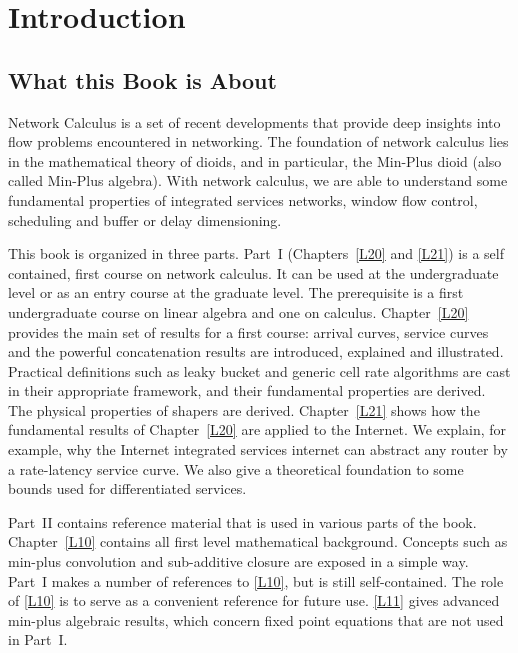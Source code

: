 \chapter{Introduction}

\section*{What this Book is About}
Network Calculus is a set of recent developments that provide deep
insights into flow problems encountered in networking. The
foundation of network calculus lies in the mathematical theory of
dioids, and in particular, the Min-Plus dioid (also called
Min-Plus algebra). With network calculus, we are able to
understand some fundamental properties of integrated services
networks,  window flow control, scheduling and buffer or delay
dimensioning.

This book is organized in three parts. Part~I (Chapters~\ref{L20}
and \ref{L21}) is a self contained, first course on network
calculus. It can be used at the undergraduate level or as an entry
course at the graduate level. The prerequisite is a first
undergraduate course on linear algebra and one on calculus.
Chapter~\ref{L20} provides the main set of results for a first
course: arrival curves, service curves and the powerful
concatenation results are introduced, explained and illustrated.
Practical definitions such as leaky bucket and generic cell rate
algorithms are cast in their appropriate framework, and their
fundamental properties are derived. The physical properties of
shapers are derived. Chapter~\ref{L21} shows how the fundamental
results of Chapter~\ref{L20} are applied to the Internet.
We explain, for example, why the Internet integrated services
internet can abstract any router by a rate-latency service curve.
We also give a theoretical foundation to some bounds used for
differentiated services.

Part~II contains reference material that is used in various parts
of the book. Chapter~\ref{L10} contains all first level
mathematical background. Concepts such as min-plus convolution and
sub-additive closure are exposed in a simple way. Part~I makes a
number of references to \cref{L10}, but is still self-contained.
The role of \cref{L10} is to serve as a convenient reference for
future use. \cref{L11} gives advanced min-plus algebraic results,
which concern fixed point equations that are not used in Part~I.

